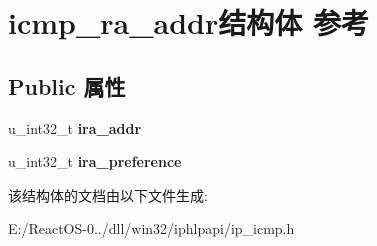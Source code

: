 \hypertarget{structicmp__ra__addr}{}\section{icmp\+\_\+ra\+\_\+addr结构体 参考}
\label{structicmp__ra__addr}
\subsection*{Public 属性}
\begin{DoxyCompactItemize}
\item 
\mbox{\label{structicmp__ra__addr_a85e1565d1ad5723eff5d3dfa3322b3e5}} 
u\+\_\+int32\+\_\+t {\bfseries ira\+\_\+addr}
\item 
\mbox{\label{structicmp__ra__addr_a95585cd789388313f05af6415f169370}} 
u\+\_\+int32\+\_\+t {\bfseries ira\+\_\+preference}
\end{DoxyCompactItemize}


该结构体的文档由以下文件生成\+:\begin{DoxyCompactItemize}
\item 
E\+:/\+React\+O\+S-\/0../dll/win32/iphlpapi/ip\+\_\+icmp.\+h\end{DoxyCompactItemize}
